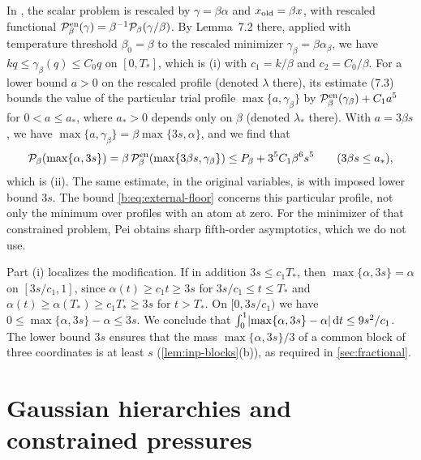 \begin{remark}\label{rem:inp-floor}
In \cite[Section~7.1]{quantitative-parisi}, the scalar problem is rescaled by
$\gamma=\beta\alpha$ and $x_{\rm old}=\beta x$, with rescaled functional
$\mathcal P^{\rm en}_\beta(\gamma)=\beta^{-1}\mathcal P_\beta(\gamma/\beta)$.
By Lemma~7.2 there, applied with temperature threshold $\beta_0=\beta$ to the
rescaled minimizer $\gamma_\beta=\beta\alpha_\beta$, we have
$kq\le\gamma_\beta(q)\le C_0q$ on $[0,T_*]$, which is (i) with $c_1=k/\beta$
and $c_2=C_0/\beta$. For a lower bound $a>0$ on the rescaled profile
(denoted $\lambda$ there), its estimate (7.3) bounds the value of the particular
trial profile $\max\{a,\gamma_\beta\}$ by $\mathcal
P^{\rm en}_\beta(\gamma_\beta)+C_1a^5$ for $0<a\le a_*$, where $a_*>0$ depends
only on $\beta$ (denoted $\lambda_*$ there). With $a=3\beta s$, we have
$\max\{a,\gamma_\beta\}=\beta\max\{3s,\alpha\}$, and we find that
\[
 \mathcal P_\beta(\max\{\alpha,3s\})
 =\beta\,\mathcal P^{\rm en}_\beta(\max\{3\beta s,\gamma_\beta\})
 \le P_\beta+3^5C_1\beta^6s^5\qquad(3\beta s\le a_*),
\]
which is (ii). The same estimate, in the original variables, is
\cite[(7.65)--(7.66)]{quantitative-parisi} with imposed lower bound $3s$. The bound
\eqref{b:eq:external-floor} concerns this particular profile, not only the
minimum over profiles with an atom at zero. For the minimizer of that
constrained problem, Pei \cite[Theorem~1(a) and Proposition~2.3(c)]{pei-fifth-order-2026}
obtains sharp fifth-order asymptotics, which we do not use.

Part (i) localizes the modification. If in addition $3s\le c_1T_*$, then
$\max\{\alpha,3s\}=\alpha$ on $[3s/c_1,1]$, since $\alpha(t)\ge c_1t\ge3s$ for
$3s/c_1\le t\le T_*$ and $\alpha(t)\ge\alpha(T_*)\ge c_1T_*\ge3s$ for $t>T_*$.
On $[0,3s/c_1)$ we have $0\le\max\{\alpha,3s\}-\alpha\le3s$. We conclude
that $\int_0^1\lvert \max\{\alpha,3s\}-\alpha\rvert\,\mathrm d t\le9s^2/c_1$. The lower bound
$3s$ ensures that the mass $\max\{\alpha,3s\}/3$ of a common block of three
coordinates is at least $s$ (\cref{lem:inp-blocks}(b)), as required in
\cref{sec:fractional}.
\end{remark}

\section{Gaussian hierarchies and constrained pressures}\label{sec:inp-hierarchies}

